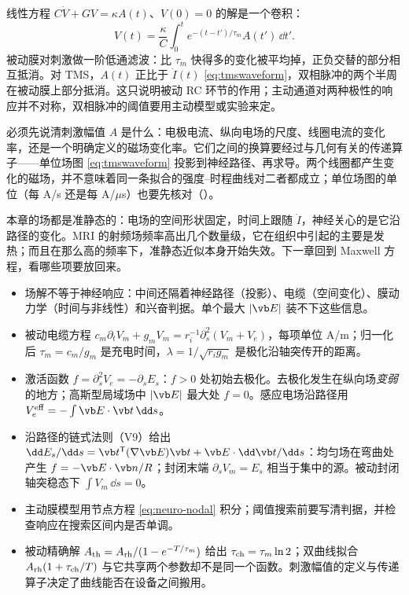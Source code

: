 \begin{deeper}[任意波形下的被动膜]
线性方程 $C\dot V+GV=\kappa A(t)$、$V(0)=0$ 的解是一个卷积：
\begin{equation*}
V(t)=\frac{\kappa}{C}\int_0^te^{-(t-t')/\tau_m}A(t')\,\dd t' .
\end{equation*}
被动膜对刺激做一阶低通滤波：比 $\tau_m$ 快得多的变化被平均掉，正负交替的部分相互抵消。对 TMS，$A(t)$ 正比于 $\dot I(t)$ \eqref{eq:tmswaveform}，双相脉冲的两个半周在被动膜上部分抵消。这只说明被动 RC 环节的作用；主动通道对两种极性的响应并不对称，双相脉冲的阈值要用主动模型或实验来定。
\end{deeper}

\begin{pitfall}
必须先说清刺激幅值 $A$ 是什么：电极电流、纵向电场的尺度、线圈电流的变化率，还是一个明确定义的磁场变化率。它们之间的换算要经过与几何有关的传递算子——单位场图 \eqref{eq:tmswaveform} 投影到神经路径、再求导。两个线圈都产生变化的磁场，并不意味着同一条拟合的强度--时程曲线对二者都成立；单位场图的单位（每 A/s 还是每 A/$\mu$s）也要先核对（）。
\end{pitfall}

本章的场都是准静态的：电场的空间形状固定，时间上跟随 $\dot I$，神经关心的是它沿路径的变化。MRI 的射频场频率高出几个数量级，它在组织中引起的主要是发热；而且在那么高的频率下，准静态近似本身开始失效。下一章回到 Maxwell 方程，看哪些项要放回来。

\begin{takeaways}
\begin{itemize}
\item 场解不等于神经响应：中间还隔着神经路径（投影）、电缆（空间变化）、膜动力学（时间与非线性）和兴奋判据。单个最大 $|\vb E|$ 装不下这些信息。
\item 被动电缆方程 $c_m\partial_tV_m+g_mV_m=r_i^{-1}\partial_s^2(V_m+V_e)$，每项单位 A/m；归一化后 $\tau_m=c_m/g_m$ 是充电时间，$\lambda=1/\sqrt{r_ig_m}$ 是极化沿轴突传开的距离。
\item 激活函数 $f=\partial_s^2V_e=-\partial_sE_s$：$f>0$ 处初始去极化。去极化发生在纵向场\emph{变弱}的地方；高斯型局域场中 $|\vb E|$ 最大处 $f=0$。感应电场沿路径用 $V_e^{\rm eff}=-\int\vb E\cdot\vb t\,\dd s$。
\item 沿路径的链式法则（V9）给出 $\dd E_s/\dd s=\vb t^{\mathsf T}(\nabla\vb E)\vb t+\vb E\cdot\dd\vb t/\dd s$：均匀场在弯曲处产生 $f=-\vb E\cdot\vb n/R$；封闭末端 $\partial_sV_m=E_s$ 相当于集中的源。被动封闭轴突稳态下 $\int V_m\,\dd s=0$。
\item 主动膜模型用节点方程 \eqref{eq:neuro-nodal} 积分；阈值搜索前要写清判据，并检查响应在搜索区间内是否单调。
\item 被动精确解 $A_{\rm th}=A_{\rm rh}/(1-e^{-T/\tau_m})$ 给出 $\tau_{\rm ch}=\tau_m\ln2$；双曲线拟合 $A_{\rm rh}(1+\tau_{\rm ch}/T)$ 与它共享两个参数却不是同一个函数。刺激幅值的定义与传递算子决定了曲线能否在设备之间搬用。
\end{itemize}
\end{takeaways}

